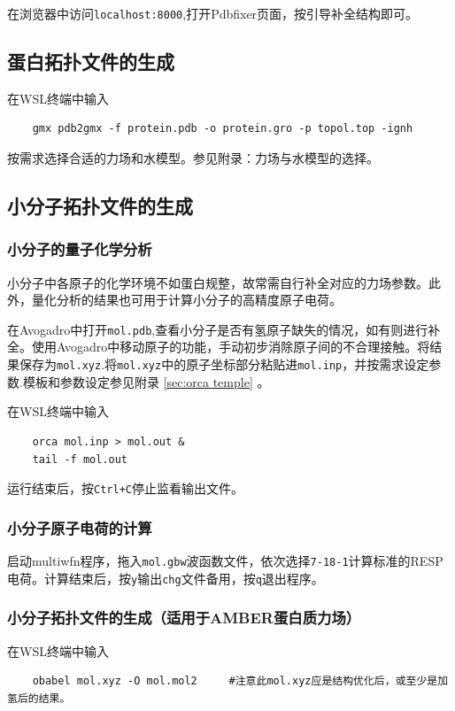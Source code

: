 \documentclass[UTF8, a4paper, 11pt]{ctexart}
\begin{document}
	在浏览器中访问\texttt{localhost:8000},打开Pdbfixer页面，按引导补全结构即可。
	
	\subsection{蛋白拓扑文件的生成}
	在WSL终端中输入
	\begin{lstlisting}
	gmx pdb2gmx -f protein.pdb -o protein.gro -p topol.top -ignh
	\end{lstlisting}
	
	按需求选择合适的力场和水模型。参见附录：力场与水模型的选择。
	
	\subsection{小分子拓扑文件的生成}
	\subsubsection{小分子的量子化学分析}
	小分子中各原子的化学环境不如蛋白规整，故常需自行补全对应的力场参数。此外，量化分析的结果也可用于计算小分子的高精度原子电荷。
	
	在Avogadro中打开\texttt{mol.pdb},查看小分子是否有氢原子缺失的情况，如有则进行补全。使用Avogadro中移动原子的功能，手动初步消除原子间的不合理接触。将结果保存为\texttt{mol.xyz}.将\texttt{mol.xyz}中的原子坐标部分粘贴进\texttt{mol.inp}，并按需求设定参数.模板和参数设定参见附录 \ref{sec:orca temple} 。
	
	在WSL终端中输入
	\begin{lstlisting}
	orca mol.inp > mol.out &
	tail -f mol.out
	\end{lstlisting}
	运行结束后，按\texttt{Ctrl+C}停止监看输出文件。
	
	\subsubsection{小分子原子电荷的计算}
	启动multiwfn程序，拖入\texttt{mol.gbw}波函数文件，依次选择\texttt{7-18-1}计算标准的RESP电荷。计算结束后，按\texttt{y}输出\texttt{chg}文件备用，按\texttt{q}退出程序。
	
	\subsubsection{小分子拓扑文件的生成（适用于AMBER蛋白质力场）}
	在WSL终端中输入
	\begin{lstlisting}
	obabel mol.xyz -O mol.mol2     #注意此mol.xyz应是结构优化后，或至少是加氢后的结果。
	\end{lstlisting}
	
\end{document}
